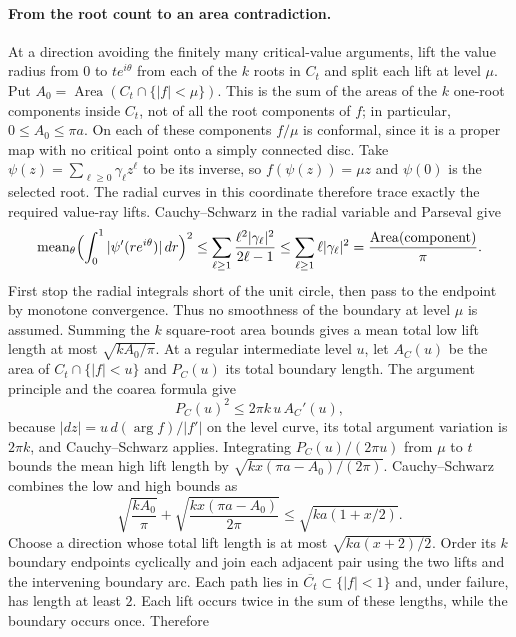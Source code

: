 \documentclass[11pt]{article}
\begin{document}
\paragraph{From the root count to an area contradiction.}
At a direction avoiding the finitely many critical-value arguments, lift the
value radius from $0$ to $te^{i\theta}$ from each of the $k$ roots in $C_t$
and split each lift at level $\mu$. Put
$A_0=\operatorname{Area}(C_t\cap\{|f|<\mu\})$. This is the sum of the
areas of the $k$ one-root components inside $C_t$, not of all the root
components of $f$; in particular, $0\le A_0\le\pi a$.
On each of these components $f/\mu$ is conformal, since it is a proper
map with no critical point onto a simply connected disc. Take
$\psi(z)=\sum_{\ell\ge0}\gamma_\ell z^\ell$ to be its inverse, so
$f(\psi(z))=\mu z$ and $\psi(0)$ is the selected root. The radial curves in
this coordinate therefore trace exactly the required value-ray lifts. Cauchy--Schwarz
in the radial variable and Parseval give
\[
 \operatorname{mean}_\theta
   \Bigl(\int_0^1|\psi'(re^{i\theta})|\,dr\Bigr)^2
 \le\sum_{\ell\ge1}\frac{\ell^2|\gamma_\ell|^2}{2\ell-1}
 \le\sum_{\ell\ge1}\ell|\gamma_\ell|^2
 =\frac{\operatorname{Area}(\text{component})}\pi.
\]
First stop the radial integrals short of the unit circle, then pass to
the endpoint by monotone convergence. Thus no smoothness
of the boundary at level $\mu$ is assumed. Summing the $k$ square-root
area bounds gives a mean total low lift length at most $\sqrt{kA_0/\pi}$.
At a regular intermediate level $u$, let $A_C(u)$ be the area of
$C_t\cap\{|f|<u\}$ and $P_C(u)$ its total boundary length.
The argument principle and the coarea formula give
\begin{equation}\label{eq:lc-perimeter}
 P_C(u)^2\le2\pi k\,u\,A_C'(u),
\end{equation}
because $|dz|=u\,d(\arg f)/|f'|$ on the level curve, its total argument
variation is $2\pi k$, and Cauchy--Schwarz applies.  Integrating
$P_C(u)/(2\pi u)$ from $\mu$ to $t$ bounds the mean high lift length by
$\sqrt{kx(\pi a-A_0)/(2\pi)}$. Cauchy--Schwarz combines the low and high
bounds as
\[
 \sqrt{\frac{kA_0}{\pi}}+
 \sqrt{\frac{kx(\pi a-A_0)}{2\pi}}
 \le\sqrt{ka(1+x/2)}.
\]
Choose a direction whose total lift length is at most
$\sqrt{ka(x+2)/2}$. Order its $k$ boundary endpoints cyclically and
join each adjacent pair using the two lifts and the intervening boundary
arc. Each path lies in $\overline{C_t}\subset\{|f|<1\}$ and, under
failure, has length at least $2$. Each lift occurs twice in the sum of
these lengths, while the boundary occurs once. Therefore
\end{document}
